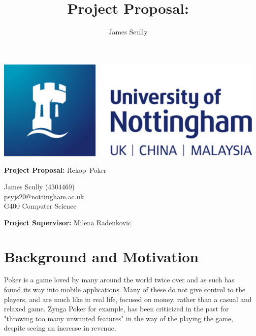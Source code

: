 \documentclass[11pt]{article}
\title{Project Proposal: \pt}
\author{James Scully}
\newcommand{\pn}{Rekop}
\begin{document}
{\selectfont


\hspace{0pt}

\vfill

\begin{center}
	\includegraphics[scale=0.35]{uni_logo}
	
	\vspace{1cm}
	
	{\Large \textbf{Project Proposal:} \pn \ Poker} \linebreak
	
	\begin{large}
		James Scully (4304469) \\
		psyjs20@nottingham.ac.uk \\
		G400 Computer Science \\
	\end{large}
	
\end{center}

\vfill

\begin{center}
	\textbf{Project Supervisor:} Milena Radenkovic
\end{center}

\hspace{0pt}

\pagebreak

\section*{Background and Motivation}



Poker is a game loved by many around the world twice over and as such has found its way into mobile applications. Many of these do not give control to the players, and are much like in real life, focused on money, rather than a casual and relaxed game. Zynga Poker for example, has been criticized in the past for "throwing too many unwanted features" in the way of the playing the game, despite seeing an increase in revenue. \cite{zynga_unwanted} \\

}
\end{document}
